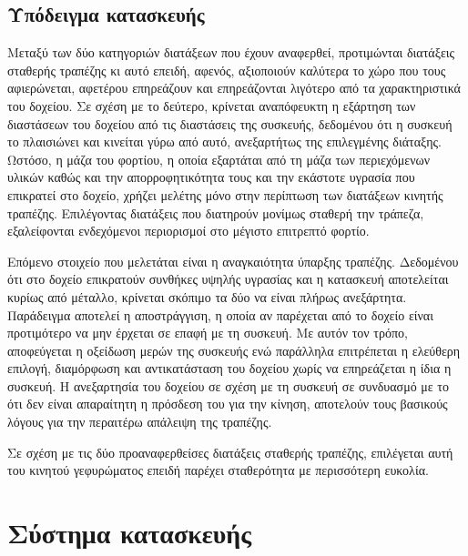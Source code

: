 \subsection{Υπόδειγμα κατασκευής}

Μεταξύ των δύο κατηγοριών διατάξεων που έχουν αναφερθεί, προτιμώνται διατάξεις
σταθερής τραπέζης κι αυτό επειδή, αφενός, αξιοποιούν καλύτερα το χώρο που τους
αφιερώνεται, αφετέρου επηρεάζουν και επηρεάζονται λιγότερο από τα χαρακτηριστικά
του δοχείου.
Σε σχέση με το δεύτερο, κρίνεται αναπόφευκτη η εξάρτηση των διαστάσεων του
δοχείου από τις διαστάσεις της συσκευής, δεδομένου ότι η συσκευή το πλαισιώνει
και κινείται γύρω από αυτό, ανεξαρτήτως της επιλεγμένης διάταξης. Ωστόσο, η μάζα
του φορτίου, η οποία εξαρτάται από τη μάζα των περιεχόμενων υλικών καθώς και την
απορροφητικότητα τους και την εκάστοτε υγρασία που επικρατεί στο δοχείο, χρήζει
μελέτης μόνο στην περίπτωση των διατάξεων κινητής τραπέζης. Επιλέγοντας
διατάξεις που διατηρούν μονίμως σταθερή την τράπεζα, εξαλείφονται ενδεχόμενοι
περιορισμοί στο μέγιστο επιτρεπτό φορτίο.
%
%
%

Επόμενο στοιχείο που μελετάται είναι η αναγκαιότητα ύπαρξης τραπέζης. Δεδομένου
ότι στο δοχείο επικρατούν συνθήκες υψηλής υγρασίας και η κατασκευή αποτελείται
κυρίως από μέταλλο, κρίνεται σκόπιμο τα δύο να είναι πλήρως ανεξάρτητα.
Παράδειγμα αποτελεί η αποστράγγιση, η οποία αν παρέχεται από το δοχείο είναι
προτιμότερο να μην έρχεται σε επαφή με τη συσκευή.
Με αυτόν τον τρόπο, αποφεύγεται η οξείδωση μερών της συσκευής ενώ παράλληλα
επιτρέπεται η ελεύθερη επιλογή, διαμόρφωση και αντικατάσταση του δοχείου χωρίς
να επηρεάζεται η ίδια η συσκευή.
Η ανεξαρτησία του δοχείου σε σχέση με τη συσκευή σε συνδυασμό με το ότι δεν
είναι απαραίτητη η πρόσδεση του για την κίνηση, αποτελούν τους βασικούς λόγους
για την περαιτέρω απάλειψη της τραπέζης.

Σε σχέση με τις δύο προαναφερθείσες διατάξεις σταθερής τραπέζης, επιλέγεται αυτή
του κινητού γεφυρώματος επειδή παρέχει σταθερότητα με περισσότερη ευκολία.


\section{Σύστημα κατασκευής}

